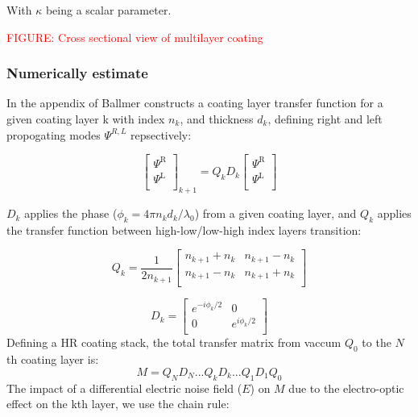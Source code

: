 With $\kappa$ being a scalar parameter.

\textcolor{red}{FIGURE: Cross sectional view of multilayer coating}

\subsubsection{Numerically estimate}

In the appendix of \cite{ballmer2015} Ballmer constructs a coating layer transfer function for a given coating layer k with index $n_k$, and thickness $d_k$, defining right and left propogating modes $\Psi^{R,L}$ repsectively:

\begin{equation}
  \left[ {\begin{array}{c}
   \Psi^\mathrm{R} \\
   \Psi^\mathrm{L} \\
  \end{array} } \right]_{k+1}
  =
%
Q_k D_k
%
 \left[{\begin{array}{c}
   \Psi^\mathrm{R} \\
   \Psi^\mathrm{L} \\
 \end{array}} \right]
\end{equation}

\noindent $D_k$ applies the phase ($\phi_k = 4\pi n_k d_k /\lambda_0$) from a given coating layer, and $Q_k$ applies the transfer function between high-low/low-high index layers transition:

\begin{equation}
Q_k = \frac{1}{2n_{k+1}}
\left[ {\begin{array}{cc}
  n_{k+1} + n_k & n_{k+1} - n_k\\
 n_{k+1} - n_k & n_{k+1} + n_k\\
\end{array} } \right]
\end{equation}

\begin{equation}
D_k =
\left[ {\begin{array}{cc}
  e^{-i \phi_k / 2}& 0\\
 0 & e^{i \phi_k / 2}\\
\end{array} } \right]
\end{equation}
Defining a HR coating stack, the total transfer matrix from vaccum $Q_0$ to the $N$th coating layer is:
\begin{equation}
M = Q_N D_N ...Q_kD_k...Q_1D_1Q_0
\end{equation}
The impact of a differential electric noise field ($E$) on $M$ due to the electro-optic effect on the kth layer, we use the chain rule:


